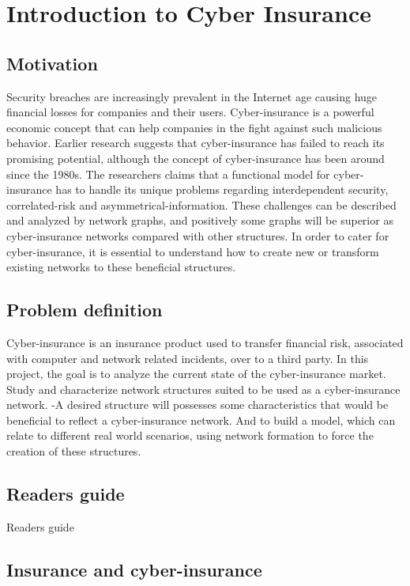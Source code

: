 \chapter{Introduction to Cyber Insurance}
\label{chp:introductionToCyberInsurance} 

\section{Motivation}
Security breaches are increasingly prevalent in the Internet age causing huge financial losses
for companies and their users. Cyber-insurance is a powerful economic concept that can help
companies in the fight against such malicious behavior. Earlier research suggests that cyber-insurance has failed to reach its promising potential, although the concept of cyber-insurance has
been around since the 1980s. The researchers claims that a functional model for cyber-insurance has to handle its unique problems regarding interdependent security, correlated-risk and asymmetrical-information. These challenges can be described and analyzed by network graphs, and positively some graphs will be superior as cyber-insurance networks compared with other structures. In order to cater for cyber-insurance, it is essential to understand how to create new or transform existing networks to these beneficial structures. 

\section{Problem definition}
Cyber-insurance is an insurance product used to transfer financial risk, associated with computer and network related incidents, over to a third party.
In this project, the goal is to analyze the current state of the cyber-insurance market. Study and characterize network structures suited to be used as a cyber-insurance network. -A desired structure will possesses some characteristics that would be beneficial to reflect a cyber-insurance network. And to build a model, which can relate to different real world scenarios, using network formation to force the creation of these structures. 
\section{Readers guide}
Readers guide 

\section{Insurance and cyber-insurance}

